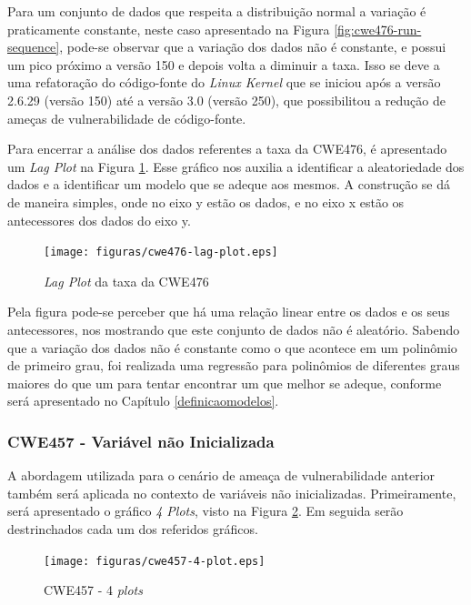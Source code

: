 Para um conjunto de dados que respeita a distribuição normal a variação é
praticamente constante, neste caso apresentado na Figura
\ref{fig:cwe476-run-sequence}, pode-se observar que a variação dos dados não é
constante, e possui um pico próximo a versão 150 e depois volta a diminuir a
taxa. Isso se deve a uma refatoração do código-fonte do \textit{Linux Kernel}
que se iniciou após a versão 2.6.29 (versão 150) até a versão 3.0 (versão 250),
que possibilitou a redução de ameças de vulnerabilidade de código-fonte.

Para encerrar a análise dos dados referentes a taxa da CWE476, é apresentado um
\textit{Lag Plot} na Figura \ref{fig:cwe476-lag-plot}. Esse gráfico nos auxilia
a identificar a aleatoriedade dos dados e a identificar um modelo que se adeque
aos mesmos. A construção se dá de maneira simples, onde no eixo y estão os
dados, e no eixo x estão os antecessores dos dados do eixo y.

\begin{figure}[h]
  \centering
  \texttt{[image: figuras/cwe476-lag-plot.eps]}
      \caption{\textit{Lag Plot} da taxa da CWE476}
      \label{fig:cwe476-lag-plot}
\end{figure}

Pela figura pode-se perceber que há uma relação linear entre os dados e os seus
antecessores, nos mostrando que este conjunto de dados não é aleatório. Sabendo
que a variação dos dados não é constante como o que acontece em um polinômio de
primeiro grau, foi realizada uma regressão para polinômios de diferentes graus
maiores do que um para tentar encontrar um que melhor se adeque, conforme será
apresentado no Capítulo \ref{definicaomodelos}.


\subsubsection{CWE457 - Variável não Inicializada}\label{eda:cwe457}

A abordagem utilizada para o cenário de ameaça de vulnerabilidade anterior
também será aplicada no contexto de variáveis não inicializadas. Primeiramente,
será apresentado o gráfico \textit{4 Plots}, visto na Figura
\ref{fig:cwe457-4-plot}. Em seguida serão destrinchados cada um dos referidos
gráficos.

\begin{figure}[h]
  \centering
  \texttt{[image: figuras/cwe457-4-plot.eps]}
      \caption{CWE457 - 4 \textit{plots}}
  \label{fig:cwe457-4-plot}
\end{figure}

